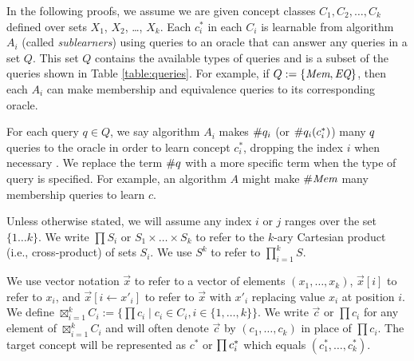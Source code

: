 In the following proofs, we assume we are given concept classes $C_1, C_2, \dots, C_k$ defined over sets $X_1$, $X_2$, \dots, $X_k$. 
Each $c^*_i$ in each $C_i$ is learnable from algorithm $A_i$ (called \emph{sublearners}) using queries to an oracle that can answer any queries in a set $Q$. 
This set $Q$ contains the available types of queries and is a subset of the queries shown in Table \ref{table:queries}.
For example, if $Q := \{ \emph{Mem}, \emph{EQ} \}$, then each $A_i$ can make membership and equivalence queries to its corresponding oracle. 


For each query $q \in Q$, we say algorithm $A_i$ makes $\#q_{i}$ (or $\#q_{i}(c^*_i)$) many $q$ queries to the oracle in order to learn concept $c^*_i$, dropping the index $i$ when necessary . 
We replace the term $\#q$ with a more specific term when the type of query is specified.
For example, an algorithm $A$ might make $\#\emph{Mem}$ many membership queries to learn $c$. 


Unless otherwise stated, we will assume any index $i$ or $j$ ranges over the set $\{ 1 \dots k \}$.
We write $\prod S_i$ or $S_1 \times \dots \times S_k$ to refer to the $k$-ary Cartesian product (i.e., cross-product) of sets $S_i$. 
We use $S^k$ to refer to $\prod_{i=1}^k S$. 

We use vector notation $\vec{x}$ to refer to a vector of elements $(x_1,\dots, x_k)$, $\vec{x}[i]$ to refer to $x_i$, and $\vec{x}[i \leftarrow x'_i]$ to refer to $\vec{x}$ with $x'_i$ replacing value $x_i$ at position $i$. 
We define $\boxtimes^k_{i=1} C_i := \{ \prod c_i \mid c_i \in C_i, i \in \{1,\dots,k\} \}$. 
We write $\vec{c}$ or $\prod c_i$ for any element of $\boxtimes^k_{i=1} C_i $ and will often denote $\vec{c}$ by $(c_1, \dots, c_k)$ in place of $\prod c_i$. 
The target concept will be represented as $c^*$ or $\prod c^*_i$ which equals $(c^*_1, \dots, c^*_k)$.




